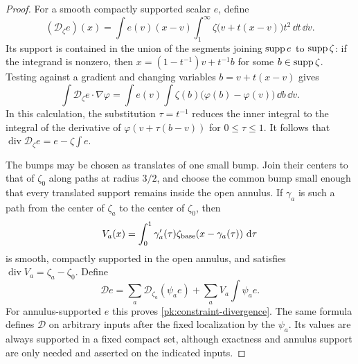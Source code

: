 \begin{proof}
For a smooth compactly supported scalar \(e\), define
\begin{equation}
 (\mathcal D_\zeta e)(x)
  =\int e(v)(x-v)
      \int_1^\infty \zeta\bigl(v+t(x-v)\bigr)t^2\,\dd t\,\dd v.
 \label{pk:constraint-Bogovskii}
\end{equation}
Its support is contained in the union of the segments joining
\(\operatorname{supp} e\) to \(\operatorname{supp}\zeta\): if the integrand is nonzero, then
\(x=(1-t^{-1})v+t^{-1}b\) for some \(b\in\operatorname{supp}\zeta\).
Testing against a gradient and changing variables
\(b=v+t(x-v)\) gives
\[
 \int \mathcal D_\zeta e\cdot\nabla\varphi
   =\int e(v)\int\zeta(b)
          \bigl(\varphi(b)-\varphi(v)\bigr)\,\dd b\,\dd v.
\]
In this calculation, the substitution \(\tau=t^{-1}\) reduces the
inner integral to the integral of the derivative of
\(\varphi(v+\tau(b-v))\) for \(0\leq\tau\leq1\).
It follows that
\(\operatorname{div}\mathcal D_\zeta e=e-\zeta\int e\).

The bumps may be chosen as translates of one small bump.  Join their
centers to that of \(\zeta_0\) along paths at radius \(3/2\), and choose
the common bump small enough that every translated support remains
inside the open annulus.  If \(\gamma_a\) is such a path from the
center of \(\zeta_a\) to the center of \(\zeta_0\), then
\[
 V_a(x)=\int_0^1\gamma_a'(\tau)
                     \zeta_{\rm base}(x-\gamma_a(\tau))\,\,\mathrm d\tau
\]
is smooth, compactly supported in the open annulus, and satisfies
\(\operatorname{div}V_a=\zeta_a-\zeta_0\).  Define
\[
 \mathcal De=
   \sum_a\mathcal D_{\zeta_a}(\psi_a e)
       +\sum_a V_a\int\psi_a e.
\]
For annulus-supported \(e\) this proves
\eqref{pk:constraint-divergence}.  The same formula defines
\(\mathcal D\) on arbitrary inputs after the fixed localization by
the \(\psi_a\).  Its values are always supported in a fixed compact
set, although exactness and annulus support are only needed and
asserted on the indicated inputs.


\end{proof}

